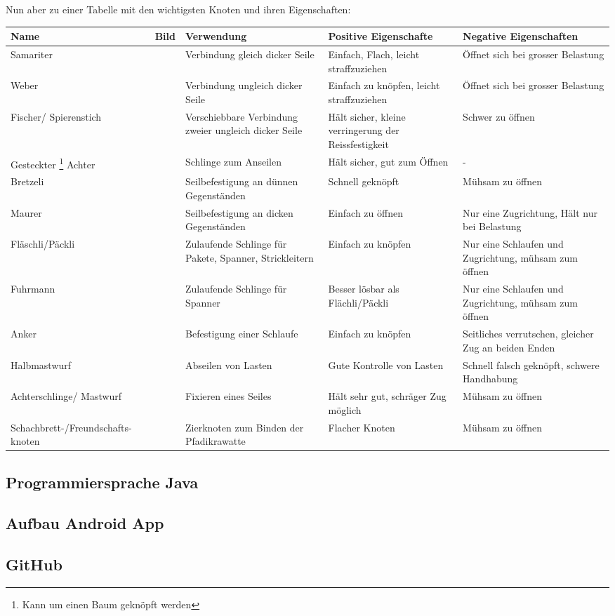Nun aber zu einer Tabelle mit den wichtigsten Knoten und ihren Eigenschaften:
\begin{center}
\begin{tabularx}{\textwidth}{X|X|X|X|X}
    \textbf{Name} & \textbf{Bild} & \textbf{Verwendung} & \textbf{Positive Eigenschafte} & \textbf{Negative Eigenschaften} \\\hline
    Samariter & & Verbindung gleich dicker Seile & Einfach, Flach, leicht straffzuziehen & Öffnet sich bei grosser Belastung \\\hline
    Weber & & Verbindung ungleich dicker Seile & Einfach zu knöpfen, leicht straffzuziehen & Öffnet sich bei grosser Belastung\\\hline
    Fischer/ Spierenstich & & Verschiebbare Verbindung zweier ungleich dicker Seile & Hält sicher, kleine verringerung der Reissfestigkeit & Schwer zu öffnen \\\hline
    Gesteckter \footnote{Kann um einen Baum geknöpft werden} Achter& & Schlinge zum Anseilen & Hält sicher, gut zum Öffnen & - \\\hline
    Bretzeli & & Seilbefestigung an dünnen Gegenständen & Schnell geknöpft & Mühsam zu öffnen \\\hline
    Maurer & & Seilbefestigung an dicken Gegenständen & Einfach zu öffnen & Nur eine Zugrichtung, Hält nur bei Belastung \\\hline
    Fläschli/Päckli & & Zulaufende Schlinge für Pakete, Spanner, Strickleitern & Einfach zu knöpfen & Nur eine Schlaufen und Zugrichtung, mühsam zum öffnen \\\hline
    Fuhrmann & & Zulaufende Schlinge für Spanner & Besser lösbar als Flächli/Päckli & Nur eine Schlaufen und Zugrichtung, mühsam zum öffnen \\\hline
    Anker & & Befestigung einer Schlaufe & Einfach zu knöpfen & Seitliches verrutschen, gleicher Zug an beiden Enden \\\hline
    Halbmastwurf & & Abseilen von Lasten & Gute Kontrolle von Lasten & Schnell falsch geknöpft, schwere Handhabung \\\hline
    Achterschlinge/ Mastwurf & & Fixieren eines Seiles & Hält sehr gut, schräger Zug möglich & Mühsam zu öffnen \\\hline
    Schachbrett-/Freundschafts- knoten & & Zierknoten zum Binden der Pfadikrawatte & Flacher Knoten & Mühsam zu öffnen \\
\end{tabularx}
\end{center}

\subsection*{Programmiersprache Java}


\subsection*{Aufbau Android App}



\subsection*{GitHub}